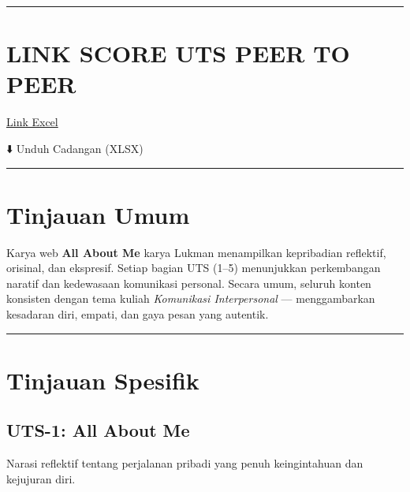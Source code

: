 \documentclass[
  letterpaper,
  DIV=11,
  numbers=noendperiod]{scrreprt}
\begin{document}
\begin{center}\rule{0.5\linewidth}{0.5pt}\end{center}

\section{LINK SCORE UTS PEER TO PEER}\label{link-score-uts-peer-to-peer}

\href{https://docs.google.com/spreadsheets/d/1e1VKO3qTs9bRmDoLfmCZYr2Acg0--6_l/edit?usp=sharing&ouid=113644725819428153387&rtpof=true&sd=true}{Link
Excel}

⬇️ Unduh Cadangan (XLSX)

\begin{center}\rule{0.5\linewidth}{0.5pt}\end{center}

\section{Tinjauan Umum}\label{tinjauan-umum}

Karya web \textbf{All About Me} karya Lukman menampilkan kepribadian
reflektif, orisinal, dan ekspresif. Setiap bagian UTS (1--5) menunjukkan
perkembangan naratif dan kedewasaan komunikasi personal. Secara umum,
seluruh konten konsisten dengan tema kuliah \emph{Komunikasi
Interpersonal} --- menggambarkan kesadaran diri, empati, dan gaya pesan
yang autentik.

\begin{center}\rule{0.5\linewidth}{0.5pt}\end{center}

\section{Tinjauan Spesifik}\label{tinjauan-spesifik}

\subsection{UTS-1: All About Me}\label{uts-1-all-about-me}

Narasi reflektif tentang perjalanan pribadi yang penuh keingintahuan dan
kejujuran diri.
\end{document}
